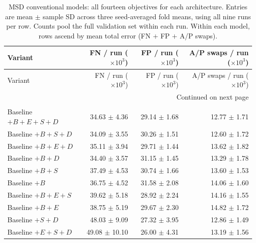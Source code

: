 \begingroup\footnotesize{}
\setlength{\tabcolsep}{4pt}
\renewcommand{\arraystretch}{1.12}
\begin{longtable}{@{}lrrr@{}}
\caption{MSD conventional models: all fourteen objectives for each architecture. Entries are mean $\pm$ sample SD across three seed-averaged fold means, using all nine runs per row. Counts pool the full validation set within each run. Within each model, rows ascend by mean total error (FN $+$ FP $+$ A/P swaps).}
\label{tab:msd-all-errors}\label{tab:capped-errors}\\
\hline
Variant & \shortstack{FN / run\\($\times 10^{3}$)} & \shortstack{FP / run\\($\times 10^{3}$)} & \shortstack{A/P swaps / run\\($\times 10^{3}$)} \\ \hline
\endfirsthead
\hline
Variant & \shortstack{FN / run\\($\times 10^{3}$)} & \shortstack{FP / run\\($\times 10^{3}$)} & \shortstack{A/P swaps / run\\($\times 10^{3}$)} \\ \hline
\endhead
\hline
\multicolumn{4}{r}{Continued on next page}\\
\endfoot
\hline\endlastfoot
\multicolumn{4}{@{}l}{\textbf{nnU-Net}}\\*
Baseline $+B+E+S+D$ & 34.63 $\pm$ 4.36 & 29.14 $\pm$ 1.68 & 12.77 $\pm$ 1.71 \\
Baseline $+B+S+D$ & 34.09 $\pm$ 3.55 & 30.26 $\pm$ 1.51 & 12.60 $\pm$ 1.72 \\
Baseline $+B+E+D$ & 35.11 $\pm$ 3.94 & 29.71 $\pm$ 1.44 & 13.62 $\pm$ 1.82 \\
Baseline $+B+D$ & 34.40 $\pm$ 3.57 & 31.15 $\pm$ 1.45 & 13.29 $\pm$ 1.78 \\
Baseline $+B+S$ & 37.49 $\pm$ 4.53 & 30.74 $\pm$ 1.66 & 13.60 $\pm$ 1.53 \\
Baseline $+B$ & 36.75 $\pm$ 4.52 & 31.58 $\pm$ 2.08 & 14.06 $\pm$ 1.60 \\
Baseline $+B+E+S$ & 39.62 $\pm$ 5.18 & 28.92 $\pm$ 2.24 & 14.16 $\pm$ 1.55 \\
Baseline $+B+E$ & 38.75 $\pm$ 5.19 & 29.67 $\pm$ 2.30 & 14.82 $\pm$ 1.72 \\
Baseline $+S+D$ & 48.03 $\pm$ 9.09 & 27.32 $\pm$ 3.95 & 12.86 $\pm$ 1.49 \\
Baseline $+E+S+D$ & 49.08 $\pm$ 10.10 & 26.00 $\pm$ 4.31 & 13.19 $\pm$ 1.56 \\

\end{longtable}

